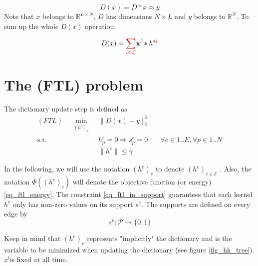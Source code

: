 $$D(x) = D*x \approx y$$
Note that $x$ belongs to $\mathbb{R}^{L\times N}$, $D$ has dimensions $N \times L$ and $y$ belongs to $\mathbb{R}^N$. To sum up the whole $D(x)$ operation:

$$
D(x) = \Req{\sum_{l \in \leaves}} \code^{\Req{l}} * h^{*\Req{l}}
$$


\section{The (FTL) problem}

The dictionary update step is defined as 
\begin{align}
(FTL) \quad \underset{\substack{(h^\text{e})_{e}}}\min & \lVert D(x) - y \rVert_2^2 \label{eq_ftl_energy}\\
\text{s.t. } & h^e_p = 0 \Rightarrow  s^e_p=0 \quad & \forall e \in 1..E, \forall p \in 1..N \label{eq_ftl_in_support} \\
 & \lVert h^e \rVert \le \gamma \label{eq_ftl_kernel_finite_nrj}
\end{align}

In the following, we will use the notation $(h^e)_{e}$ to denote $(h^e)_{e \in \mathcal{E}}$ . Also, the notation $\Phi((h^e)_{e})$ will denote the objective function (or energy) \ref{eq_ftl_energy}.
The constraint \ref{eq_ftl_in_support} guarantees that each kernel $h^e$ only has non-zero values on its support $s^e$. The supports are defined on every edge by
$$s^e : \mathcal{P} \rightarrow \{0,1\}$$

Keep in mind that $(h^e)_e$ represents "implicitly" the dictionary and is the variable to be minimized when updating the dictionary (see figure \ref{fig_hk_tree}). $x^l$is fixed at all time.


